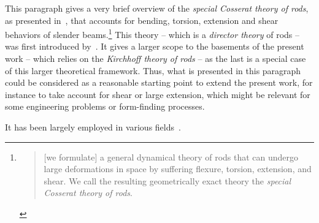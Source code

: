 This paragraph gives a very brief overview of the \emph{special Cosserat theory of rods}, as presented in~\cite{Antman2005}, that accounts for bending, torsion, extension and shear  behaviors of slender beams.\footnote{\blockcquote[p.~270]{Antman2005}{[we formulate] a general dynamical theory of rods that can undergo large deformations in space by suffering flexure, torsion, extension, and shear. We call the resulting geometrically exact theory the \emph{special Cosserat theory of rods}.}} This theory -- which is a \emph{director theory} of rods -- was first introduced by~\cite{Antman1974}. It gives a larger scope to the basements of the present work -- which relies on the \emph{Kirchhoff theory of rods} -- as the last is a special case of this larger theoretical framework. Thus, what is presented in this paragraph could be considered as a reasonable starting point to extend the present work, for instance to take account for shear or large extension, which might be relevant for some engineering problems or form-finding processes.

 It has been largely employed in various fields~\cite{Shi1995, Bergou2010}.

